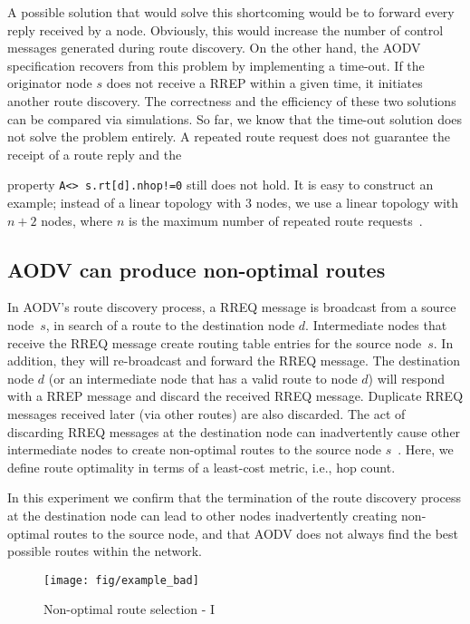 \documentclass[conference,twoside]{IEEEtran}
\begin{document}
A possible solution that would solve this shortcoming would be to forward every reply
received by a node.  Obviously, this would increase the number of control messages generated during route discovery. On the other hand, the AODV specification recovers from this problem by implementing a time-out. If the originator node $s$ does not receive a RREP within a given time, it initiates another route discovery.  The correctness and the efficiency of these two solutions can be compared via simulations. So far, we know  that the time-out solution does not solve the
problem entirely. A repeated route request does not guarantee
the receipt of a route reply and the

\pagebreak
\vspace*{-36pt}

\noindent
property {\tt A<>  s.rt[d]\!.nhop!=0}
still does not hold. It is easy to construct an example;
instead of a linear topology with $3$ nodes, we use a linear topology
with $n+2$ nodes,
where $n$ is the maximum number of repeated route requests~\cite{TR11}.


\subsection{AODV can produce non-optimal routes}
In AODV's route discovery process, a RREQ message is broadcast from a
source node~$s$, in search of a route to the destination node
$d$. Intermediate nodes that receive the RREQ message create routing
table entries for the source node~$s$. In addition, they will
re-broadcast and forward the RREQ message. The destination node $d$ (or an intermediate node that has a valid route to node $d$) will respond with a RREP message and discard the received RREQ message. Duplicate RREQ messages received later (via other routes) are also discarded.  The act of discarding RREQ messages at the destination node can inadvertently cause other intermediate nodes to create non-optimal routes to the source node $s$~\cite{MK10}. Here, we define route optimality in terms of a least-cost metric, i.e., hop count.

In this experiment we confirm that the termination of the route discovery process at the destination node can lead to
other nodes inadvertently creating non-optimal routes to the source node, and that AODV does not always find the best possible routes within the network.

\begin{figure}[ht]
\centerline{
\texttt{[image: fig/example\_bad]}}
\caption{Non-optimal route selection - I}
\label{fig:non-optimal-route}
\end{figure}
\end{document}
